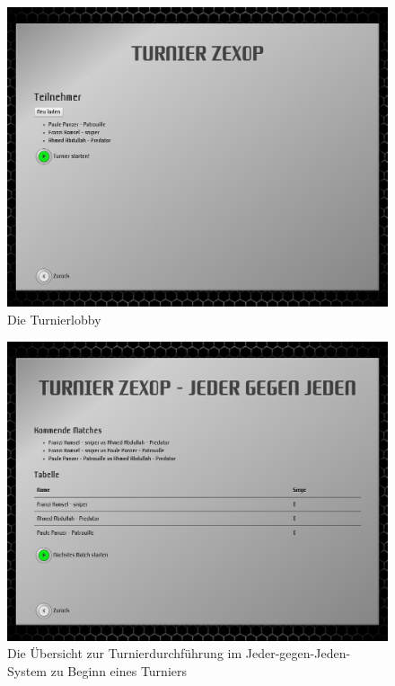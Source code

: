 \begin{figure}
  \centering
  \label{tournament-lobby}
  \includegraphics[width=15cm, keepaspectratio]{figures/10-turnierlobby.png}
  \caption{Die Turnierlobby}
\end{figure}

\begin{figure}
  \centering
  \label{tournament-execution-start}
  \includegraphics[width=15cm, keepaspectratio]{figures/11-turnierdurchfuehrung-start.png}
  \caption{Die Übersicht zur Turnierdurchführung im Jeder-gegen-Jeden-System zu Beginn eines Turniers}
\end{figure}

